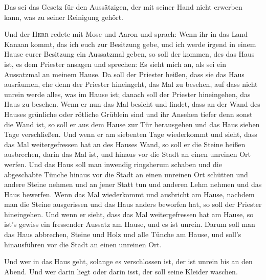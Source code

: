  Das sei das Gesetz für den Aussätzigen, der mit seiner
Hand nicht erwerben kann, was zu seiner Reinigung gehört.

 Und der \textsc{Herr} redete mit Mose und Aaron und
sprach:  Wenn ihr in das Land Kanaan kommt, das ich euch
zur Besitzung gebe, und ich werde irgend in einem Hause eurer Besitzung
ein Aussatzmal geben,  so soll der kommen, des das Haus
ist, es dem Priester ansagen und sprechen: Es sieht mich an, als sei ein
Aussatzmal an meinem Hause.  Da soll der Priester heißen,
dass sie das Haus ausräumen, ehe denn der Priester hineingeht, das Mal
zu besehen, auf dass nicht unrein werde alles, was im Hause ist; danach
soll der Priester hineingehen, das Haus zu besehen.  Wenn
er nun das Mal besieht und findet, dass an der Wand des Hauses grünliche
oder rötliche Grüblein sind und ihr Ansehen tiefer denn sonst die Wand
ist,  so soll er aus dem Hause zur Tür herausgehen und
das Haus sieben Tage verschließen.  Und wenn er am
siebenten Tage wiederkommt und sieht, dass das Mal weitergefressen hat
an des Hauses Wand,  so soll er die Steine heißen
ausbrechen, darin das Mal ist, und hinaus vor die Stadt an einen
unreinen Ort werfen.  Und das Haus soll man inwendig
ringsherum schaben und die abgeschabte Tünche hinaus vor die Stadt an
einen unreinen Ort schütten  und andere Steine nehmen und
an jener Statt tun und anderen Lehm nehmen und das Haus bewerfen.
 Wenn das Mal wiederkommt und ausbricht am Hause, nachdem
man die Steine ausgerissen und das Haus anders beworfen hat,
 so soll der Priester hineingehen. Und wenn er sieht,
dass das Mal weitergefressen hat am Hause, so ist's gewiss ein
fressender Aussatz am Hause, und es ist unrein.  Darum
soll man das Haus abbrechen, Steine und Holz und alle Tünche am Hause,
und soll's hinausführen vor die Stadt an einen unreinen Ort.

 Und wer in das Haus geht, solange es verschlossen ist,
der ist unrein bis an den Abend.  Und wer darin liegt
oder darin isst, der soll seine Kleider waschen.

